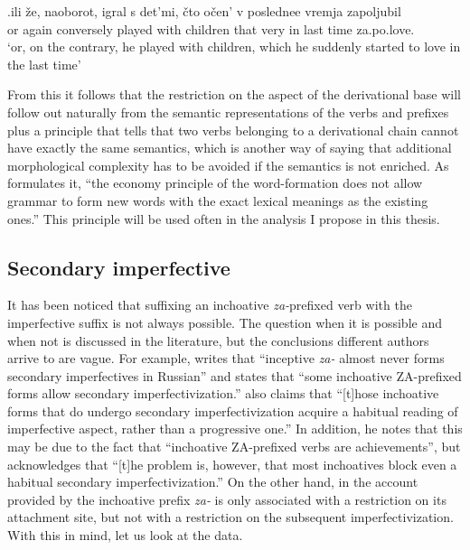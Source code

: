 \exg.\label{ex:zapoljubit}ili \v{z}e, naoborot, igral s det'mi, \v{c}to o\v{c}en' v poslednee vremja zapoljubil\\
or again conversely played with children that very in last time za.po.love.\\
\trans `or, on the contrary, he played with children, which he suddenly started to love in the last time'

From this it follows that the restriction on the aspect of the derivational base will follow out naturally from the semantic representations of the verbs and prefixes plus a principle that tells that two verbs belonging to a derivational chain cannot have exactly the same semantics, which is another way of saying that additional morphological complexity has to be avoided if the semantics is not enriched. As \citet{Braginsky:08} formulates it, ``the economy principle of the word-formation does not allow grammar to form new words with the
exact lexical meanings as the existing ones.'' This principle will be used often in the analysis I propose in this thesis.


\subsection{Secondary imperfective}
It has been noticed that suffixing an inchoative \textit{za-}prefixed verb with the imperfective suffix is not always possible. The question when it is possible and when not is discussed in the literature, but the conclusions different authors arrive to are vague. For example, \citet[230]{Svenonius:04b} writes that ``inceptive \textit{za-} almost never forms secondary imperfectives in Russian'' and \citet[220]{Braginsky:08} states that ``some inchoative ZA-prefixed forms allow secondary imperfectivization.'' \citet[231]{Braginsky:08} also claims that ``[t]hose inchoative forms that do undergo secondary imperfectivization acquire a habitual reading of imperfective aspect, rather than a progressive one.'' In addition, he notes that this may be due to the fact that ``inchoative ZA-prefixed verbs are achievements'', but acknowledges that ``[t]he problem is, however, that most inchoatives block even a habitual secondary imperfectivization.'' On the other hand, in the account provided by \citet{Tatevosov:09} the inchoative prefix \textit{za-} is only associated with a restriction on its attachment site, but not with a restriction on the subsequent imperfectivization. With this in mind, let us look at the data. 

